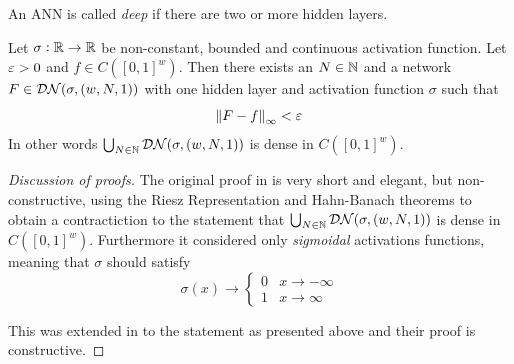 An ANN is called \emph{deep} if there are two or more hidden layers.



\begin{thm}
  Let $\sigma: \mathbb{R} \to \mathbb{R}$ be non-constant, bounded and continuous
  activation function.
  Let $\varepsilon > 0$ and $f \in C([0,1]^w)$.
  Then there exists an $N \in \mathbb{N}$ and a network
  $F \in \mathcal{DN}(\sigma, (w, N, 1))$
  with one hidden layer
  and activation function $\sigma$ such that
  \[ \norm{F - f}_\infty < \varepsilon \]
  In other words $\bigcup_{N \in \mathbb{N}} \mathcal{DN}(\sigma, (w, N, 1))$ is
  dense in $C([0,1]^w)$.
  \label{thm:uniApprox}
\end{thm}
\begin{proof}[Discussion of proofs]
  The original proof in  is very short and elegant,
  but non-constructive,
  using the Riesz Representation and Hahn-Banach theorems to
  obtain a contractiction to the statement that
  $\bigcup_{N \in \mathbb{N}} \mathcal{DN}(\sigma, (w,N,1))$
  is dense in $C([0,1]^w)$.
  Furthermore it considered only \emph{sigmoidal} activations
  functions, meaning that $\sigma$ should satisfy
  \[ \sigma(x) \to \begin{cases} 0 & x \to -\infty
  \\ 1 & x \to \infty \end{cases} \]
  
  This was extended in  to the statement as presented above
  and their proof is constructive. 
\end{proof}

